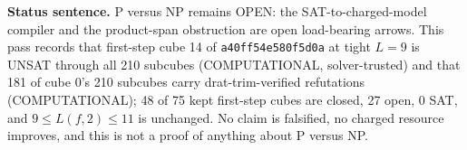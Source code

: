 \documentclass[11pt]{article}
\begin{document}
\bigskip
\noindent\textbf{Status sentence.} P versus NP remains OPEN: the SAT-to-charged-model compiler and the product-span obstruction are open load-bearing arrows. This pass records that first-step cube 14 of \texttt{a40ff54e580f5d0a} at tight $L=9$ is UNSAT through all 210 subcubes (COMPUTATIONAL, solver-trusted) and that 181 of cube 0's 210 subcubes carry drat-trim-verified refutations (COMPUTATIONAL); 48 of 75 kept first-step cubes are closed, 27 open, 0 SAT, and $9\le L(f,2)\le 11$ is unchanged. No claim is falsified, no charged resource improves, and this is not a proof of anything about P versus NP.
\end{document}

